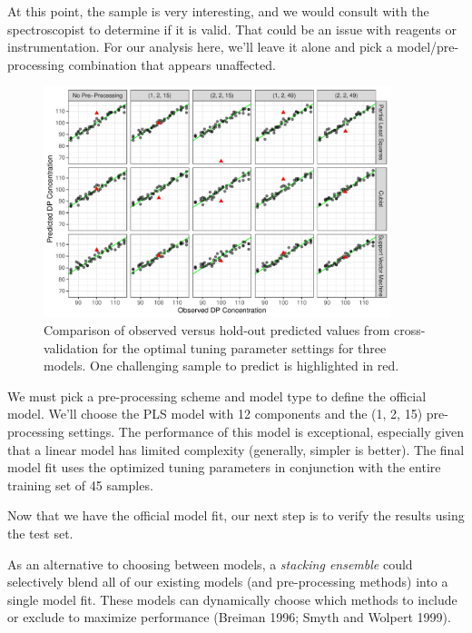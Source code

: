 \documentclass[
  letterpaper,
  DIV=11,
  numbers=noendperiod]{scrartcl}
\begin{document}
At this point, the sample is very interesting, and we would consult with
the spectroscopist to determine if it is valid. That could be an issue
with reagents or instrumentation. For our analysis here, we'll leave it
alone and pick a model/pre-processing combination that appears
unaffected.

\begin{figure}[t!]

{\centering \includegraphics[width=0.9\textwidth,height=\textheight]{figures/fig-obs-pred-cv-comparison-1.pdf}

}

\caption{\label{fig-obs-pred-cv-comparison}Comparison of observed versus
hold-out predicted values from cross-validation for the optimal tuning
parameter settings for three models. One challenging sample to predict
is highlighted in red.}

\end{figure}

We must pick a pre-processing scheme and model type to define the
official model. We'll choose the PLS model with 12 components and the
(1, 2, 15) pre-processing settings. The performance of this model is
exceptional, especially given that a linear model has limited complexity
(generally, simpler is better). The final model fit uses the optimized
tuning parameters in conjunction with the entire training set of 45
samples.

Now that we have the official model fit, our next step is to verify the
results using the test set.

As an alternative to choosing between models, a \emph{stacking ensemble}
could selectively blend all of our existing models (and pre-processing
methods) into a single model fit. These models can dynamically choose
which methods to include or exclude to maximize performance (Breiman
1996; Smyth and Wolpert 1999).
\end{document}

